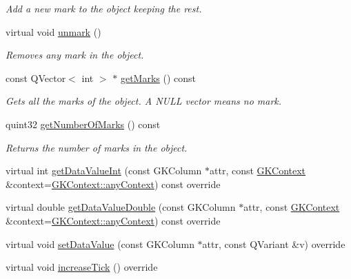 \begin{DoxyCompactItemize}
\begin{DoxyCompactList}\small\item\em Add a new mark to the object keeping the rest. \end{DoxyCompactList}\item 
virtual void \hyperlink{classGKGeoObject_a8e5528f7a64dbd78080d65e6354d1a22}{unmark} ()\hypertarget{classGKGeoObject_a8e5528f7a64dbd78080d65e6354d1a22}{}\label{classGKGeoObject_a8e5528f7a64dbd78080d65e6354d1a22}

\begin{DoxyCompactList}\small\item\em Removes any mark in the object. \end{DoxyCompactList}\item 
const Q\+Vector$<$ int $>$ $\ast$ \hyperlink{classGKGeoObject_ae8b262aa37cad6be9afc4bd0b1a2d9b7}{get\+Marks} () const \hypertarget{classGKGeoObject_ae8b262aa37cad6be9afc4bd0b1a2d9b7}{}\label{classGKGeoObject_ae8b262aa37cad6be9afc4bd0b1a2d9b7}

\begin{DoxyCompactList}\small\item\em Gets all the marks of the object. A N\+U\+LL vector means no mark. \end{DoxyCompactList}\item 
quint32 \hyperlink{classGKGeoObject_a7100a655a7d87fd956df6075b74db2f9}{get\+Number\+Of\+Marks} () const \hypertarget{classGKGeoObject_a7100a655a7d87fd956df6075b74db2f9}{}\label{classGKGeoObject_a7100a655a7d87fd956df6075b74db2f9}

\begin{DoxyCompactList}\small\item\em Returns the number of marks in the object. \end{DoxyCompactList}\item 
virtual int \hyperlink{classGKGeoObject_afb827f2d02c261840b9f60b54d66977a}{get\+Data\+Value\+Int} (const G\+K\+Column $\ast$attr, const \hyperlink{classGKContext}{G\+K\+Context} \&context=\hyperlink{classGKContext_a37de2dc1b6bab087b9b92a445922e79d}{G\+K\+Context\+::any\+Context}) const override
\item 
virtual double \hyperlink{classGKGeoObject_ac32ff25339c108c9c4eb1327bd1cdad4}{get\+Data\+Value\+Double} (const G\+K\+Column $\ast$attr, const \hyperlink{classGKContext}{G\+K\+Context} \&context=\hyperlink{classGKContext_a37de2dc1b6bab087b9b92a445922e79d}{G\+K\+Context\+::any\+Context}) const override
\item 
virtual void \hyperlink{classGKGeoObject_ad86c134ad0733ca08d9663205cc72e39}{set\+Data\+Value} (const G\+K\+Column $\ast$attr, const Q\+Variant \&v) override
\item 
virtual void \hyperlink{classGKGeoObject_ad7741c593a280579d11686f3ef0024d9}{increase\+Tick} () override\hypertarget{classGKGeoObject_ad7741c593a280579d11686f3ef0024d9}{}\label{classGKGeoObject_ad7741c593a280579d11686f3ef0024d9}


\end{DoxyCompactItemize}
